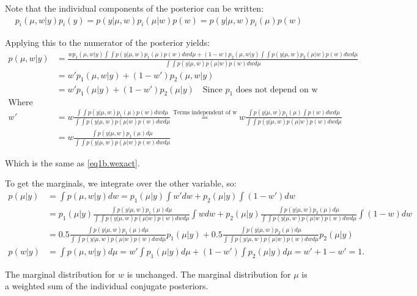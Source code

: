 \documentclass{article}
\begin{document}
Note that the individual components of the posterior can be written:
\begin{align}
p_i(\mu, w | y) p_i(y) = p(y | \mu, w) p_i(\mu | w) p(w) = p(y | \mu, w) p_i(\mu) p(w)
\end{align}

Applying this to the numerator of the posterior yields:
\begin{align}
p(\mu, w | y) &= \frac{w p_1(\mu,w|y) \int \int p(y|\mu, w)p_1(\mu)p(w) dw d\mu + (1-w) p_2(\mu, w | y) \int \int p(y|\mu, w)p_2(\mu|w)p(w) dw d\mu}{\int \int p(y|\mu, w)p(\mu|w)p(w) dw d\mu} \\
&= w'p_1(\mu, w |y) + (1-w')p_2(\mu, w|y) \\
&= w'p_1(\mu | y) + (1-w')p_2(\mu | y) \quad \text{Since $p_1$ does not depend on w} \\ 
\text{Where} \\
w' &= w\frac{\int \int p(y|\mu, w)p_1(\mu)p(w) dw d\mu}{\int \int p(y|\mu, w)p(\mu|w)p(w) dw d\mu} \stackrel{\text{Terms independent of w}}{=} w\frac{\int p(y|\mu, w)p_1(\mu) \int p(w) dw d\mu}{\int \int p(y|\mu, w)p(\mu|w)p(w) dw d\mu} \\
&= w\frac{\int p(y|\mu, w)p_1(\mu) d\mu}{\int \int p(y|\mu, w)p(\mu|w)p(w) dw d\mu}
\end{align}

Which is the same as \eqref{eq1b.wexact}. 

To get the marginals, we integrate over the other variable, so:
\begin{align}
p(\mu | y) &= \int p(\mu, w | y) dw = p_1(\mu|y) \int w' dw + p_2(\mu|y) \int (1-w') dw \\
&= p_1(\mu|y) \frac{\int p(y|\mu, w)p_1(\mu) d\mu}{\int \int p(y|\mu, w)p(\mu|w)p(w) dw d\mu} \int w dw + p_2(\mu|y) \frac{\int p(y|\mu, w)p_2(\mu) d\mu}{\int \int p(y|\mu, w)p(\mu|w)p(w) dw d\mu} \int (1-w) dw \\
&= 0.5\frac{\int p(y|\mu, w)p_1(\mu) d\mu}{\int \int p(y|\mu, w)p(\mu|w)p(w) dw d\mu}p_1(\mu|y)  + 0.5 \frac{\int p(y|\mu, w)p_2(\mu) d\mu}{\int \int p(y|\mu, w)p(\mu|w)p(w) dw d\mu}p_2(\mu|y) \\
p(w | y) &= \int p(\mu, w | y) d\mu = w'\int p_1(\mu|y) d\mu + (1-w') \int p_2(\mu | y) d\mu = w' + 1-w' = 1. 
\end{align}

The marginal distribution for $w$ is unchanged. The marginal distribution for $\mu$ is a weighted sum of the individual conjugate posteriors. 

\newpage
\end{document}
